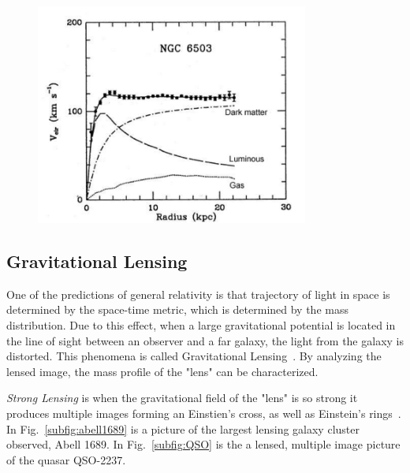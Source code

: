  \begin{figure}[]
	\centering
	\includegraphics[width=0.8\textwidth]{figs/rotationCurve6503.png}
	\label{fig:emissionType}
\end{figure}  

\subsection{Gravitational Lensing}
  
One of the predictions of general relativity is that trajectory of light in space is determined by the space-time metric, which is determined by the mass distribution. Due to this effect, when a large gravitational potential is located in the line of sight between an observer and a far galaxy, the light from the galaxy is distorted. This phenomena is called Gravitational Lensing~\cite{Bertone:2010zza}. By analyzing the lensed image, the mass profile of the "lens" can be characterized.

\textit{Strong Lensing} is when the gravitational field of the "lens" is so strong it produces multiple images forming an Einstien's cross, as well as Einstein's rings~\cite{Einstein:1956zz}. In Fig.~\ref{subfig:abell1689} is a picture of the largest lensing galaxy cluster observed, Abell 1689. In Fig.~\ref{subfig:QSO} is the a lensed, multiple image picture of the quasar QSO-2237. 

